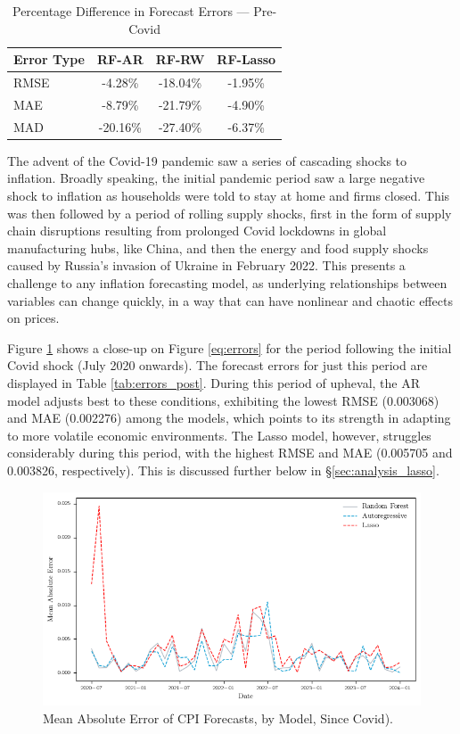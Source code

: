 \begin{table}[H]
\centering
\caption{Percentage Difference in Forecast Errors — Pre-Covid} \label{tab:diff_pre}
\begin{tabular}{lccc}
\toprule
Error Type & RF-AR & RF-RW & RF-Lasso \\
\midrule
RMSE & -4.28\% & -18.04\% & -1.95\% \\
MAE  & -8.79\% & -21.79\% & -4.90\% \\
MAD  & -20.16\% & -27.40\% & -6.37\% \\
\bottomrule
\end{tabular}
\end{table}


The advent of the Covid-19 pandemic saw a series of cascading shocks to inflation. Broadly speaking, the initial pandemic period saw a large negative shock to inflation as households were told to stay at home and firms closed. This was then followed by a period of rolling supply shocks, first in the form of supply chain disruptions resulting from prolonged Covid lockdowns in global manufacturing hubs, like China, and then the energy and food supply shocks caused by Russia's invasion of Ukraine in February 2022. This presents a challenge to any inflation forecasting model, as underlying relationships between variables can change quickly, in a way that can have nonlinear and chaotic effects on prices. 

Figure \ref{fig:errors_covid} shows a close-up on Figure \ref{eq:errors} for the period following the initial Covid shock (July 2020 onwards). The forecast errors for just this period are displayed in Table \ref{tab:errors_post}. During this period of upheval, the AR model adjusts best to these conditions, exhibiting the lowest RMSE (0.003068) and MAE (0.002276) among the models, which points to its strength in adapting to more volatile economic environments. The Lasso model, however, struggles considerably during this period, with the highest RMSE and MAE (0.005705 and 0.003826, respectively). This is discussed further below in \S \ref{sec:analysis_lasso}. 


\begin{figure}[H]
    \centering
    \includegraphics[width=1\linewidth]{figures/errors_covid.png}
    \vspace{-30pt}
    \caption{Mean Absolute Error of CPI Forecasts, by Model, Since Covid).}
    \label{fig:errors_covid} 
\end{figure}



